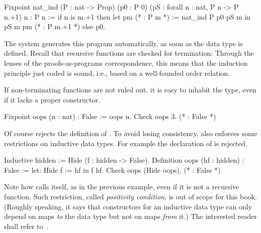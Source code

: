 \begin{coq}{}{}
Fixpoint nat_ind (P : nat -> Prop)
  (p0 : P 0) (pS : forall n : nat, P n -> P n.+1) n : P n :=
  if n is m.+1 then
    let pm (* : P m *) := nat_ind P p0 pS m in
    pS m pm (* : P m.+1 *)
  else p0.
\end{coq}

The \Coq{} system generates this program automatically, as soon as
 the  data type
is defined.  Recall that recursive functions are checked for termination:
Through the lenses of the proofs-as-programs correspondence, this means
that the induction principle just coded is sound, i.e., based on a
well-founded order relation.

If non-terminating functions are not ruled out, it is easy to inhabit
the  type, even if it lacks a proper constructor.

\begin{coq}{}{}
Fixpoint oops (n : nat) : False := oops n.
Check oops 3.  (* : False *)
\end{coq}
Of course \Coq{} rejects the definition of .  To avoid
losing consistency, \Coq{} also enforces some restrictions on
inductive data types.  For example the declaration of 
is rejected.

\begin{coq}{}{}
Inductive hidden := Hide (f : hidden -> False).
Definition oops (hf : hidden) : False := let: Hide f := hf in f hf.
Check oops (Hide oops).  (* : False *)
\end{coq}
Note how  calls itself, as in the previous example,
even if it is not a recursive function.
Such restriction, called
\emph{positivity condition}, is out of scope for this book.
(Roughly speaking, it says that constructors for an inductive data
type can only depend on maps \emph{to} the data type but not on maps
\emph{from} it.)
The interested reader shall refer to~\cite{Coq:manual}.



